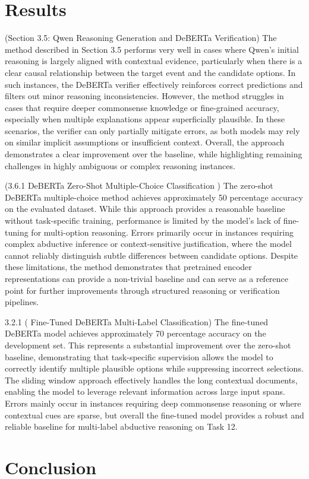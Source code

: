 \documentclass{article}
\begin{document}
\section{Results}

(Section 3.5: Qwen Reasoning Generation and DeBERTa Verification)
The method described in Section 3.5 performs very well in cases where Qwen’s initial reasoning is largely aligned with contextual evidence, particularly when there is a clear causal relationship between the target event and the candidate options. In such instances, the DeBERTa verifier effectively reinforces correct predictions and filters out minor reasoning inconsistencies. However, the method struggles in cases that require deeper commonsense knowledge or fine-grained accuracy, especially when multiple explanations appear superficially plausible. In these scenarios, the verifier can only partially mitigate errors, as both models may rely on similar implicit assumptions or insufficient context. Overall, the approach demonstrates a clear improvement over the baseline, while highlighting remaining challenges in highly ambiguous or complex reasoning instances.

(3.6.1 DeBERTa Zero-Shot Multiple-Choice Classification )
The zero-shot DeBERTa multiple-choice method achieves approximately 50 percentage  accuracy on the evaluated dataset. While this approach provides a reasonable baseline without task-specific training, performance is limited by the model’s lack of fine-tuning for multi-option reasoning. Errors primarily occur in instances requiring complex abductive inference or context-sensitive justification, where the model cannot reliably distinguish subtle differences between candidate options. Despite these limitations, the method demonstrates that pretrained encoder representations can provide a non-trivial baseline and can serve as a reference point for further improvements through structured reasoning or verification pipelines.

3.2.1 ( Fine-Tuned DeBERTa Multi-Label Classification)
The fine-tuned DeBERTa model achieves approximately 70 percentage accuracy on the development set. This represents a substantial improvement over the zero-shot baseline, demonstrating that task-specific supervision allows the model to correctly identify multiple plausible options while suppressing incorrect selections. The sliding window approach effectively handles the long contextual documents, enabling the model to leverage relevant information across large input spans. Errors mainly occur in instances requiring deep commonsense reasoning or where contextual cues are sparse, but overall the fine-tuned model provides a robust and reliable baseline for multi-label abductive reasoning on Task 12.
\section{Conclusion}






\nocite{*}
\end{document}
